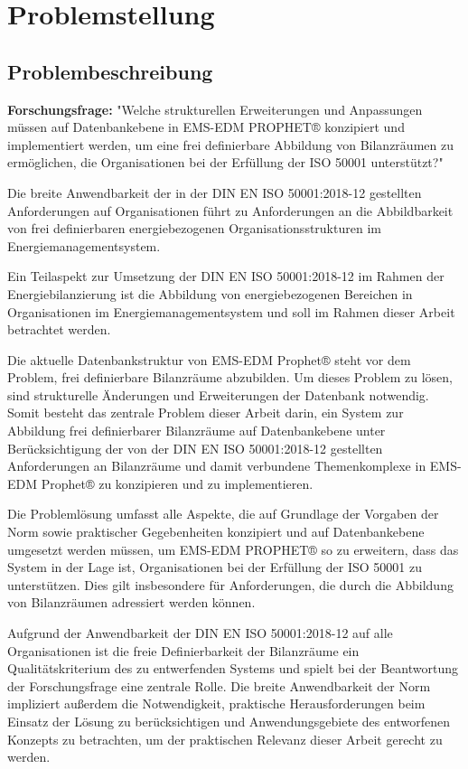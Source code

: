 \section{Problemstellung}
\subsection{Problembeschreibung}
\textbf{Forschungsfrage:} "Welche strukturellen Erweiterungen und Anpassungen müssen auf Datenbankebene in EMS-EDM PROPHET® konzipiert und implementiert 
werden, um eine frei definierbare Abbildung von Bilanzräumen zu ermöglichen, die Organisationen bei der Erfüllung der ISO 50001 unterstützt?"

Die breite Anwendbarkeit der in der DIN EN ISO 50001:2018-12 gestellten Anforderungen auf Organisationen führt zu Anforderungen an die Abbildbarkeit von 
frei definierbaren energiebezogenen Organisationsstrukturen im Energiemanagementsystem.

Ein Teilaspekt zur Umsetzung der DIN EN ISO 50001:2018-12 im Rahmen der Energiebilanzierung ist die Abbildung von energiebezogenen Bereichen in 
Organisationen im Energiemanagementsystem und soll im Rahmen dieser Arbeit betrachtet werden.

Die aktuelle Datenbankstruktur von EMS-EDM Prophet® steht vor dem Problem, frei definierbare Bilanzräume abzubilden.
Um dieses Problem zu lösen, sind strukturelle Änderungen und Erweiterungen der Datenbank notwendig.
Somit besteht das zentrale Problem dieser Arbeit darin, ein System zur Abbildung frei definierbarer Bilanzräume auf Datenbankebene unter Berücksichtigung 
der von der DIN EN ISO 50001:2018-12 gestellten Anforderungen an Bilanzräume und damit verbundene Themenkomplexe in EMS-EDM Prophet® zu konzipieren und 
zu implementieren.

Die Problemlösung umfasst alle Aspekte, die auf Grundlage der Vorgaben der Norm sowie praktischer Gegebenheiten konzipiert und auf Datenbankebene 
umgesetzt werden müssen, um EMS-EDM PROPHET® so zu erweitern, dass das System in der Lage ist, Organisationen bei der Erfüllung der ISO 50001 zu 
unterstützen. Dies gilt insbesondere für Anforderungen, die durch die Abbildung von Bilanzräumen adressiert werden können.

Aufgrund der Anwendbarkeit der DIN EN ISO 50001:2018-12 auf alle Organisationen ist die freie Definierbarkeit der Bilanzräume ein Qualitätskriterium des zu 
entwerfenden Systems und spielt bei der Beantwortung der Forschungsfrage eine zentrale Rolle.
Die breite Anwendbarkeit der Norm impliziert außerdem die Notwendigkeit, praktische Herausforderungen beim Einsatz der Lösung zu berücksichtigen und 
Anwendungsgebiete des entworfenen Konzepts zu betrachten, um der praktischen Relevanz dieser Arbeit gerecht zu werden.

